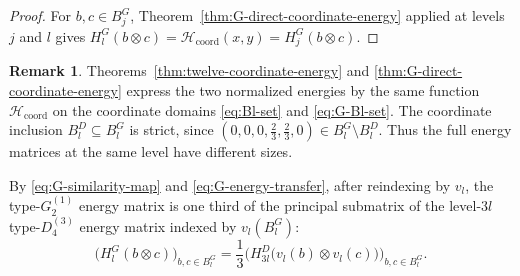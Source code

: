 \documentclass[11pt,reqno]{amsart}
\numberwithin{table}{section}
\numberwithin{equation}{section}
\theoremstyle{plain}
\theoremstyle{definition}
\newtheorem{remark}[theorem]{Remark}
\begin{document}
\begin{proof}
	For \(b,c\in B_j^G\),
	Theorem~\ref{thm:G-direct-coordinate-energy}
	applied at levels \(j\) and \(l\) gives
	\(H_l^G(b\otimes c)
	=\mathscr H_{\mathrm{coord}}(x,y)
	=H_j^G(b\otimes c)\).
\end{proof}

\begin{remark}
	Theorems~\ref{thm:twelve-coordinate-energy} and
	\ref{thm:G-direct-coordinate-energy} express the two normalized
	energies by the same function
	\(\mathscr H_{\mathrm{coord}}\) on the coordinate domains
	\eqref{eq:Bl-set} and \eqref{eq:G-Bl-set}.
	The coordinate inclusion \(B_l^D\subseteq B_l^G\) is strict,
	since
	\((0,0,0,\tfrac23,\tfrac23,0)\in B_l^G\setminus B_l^D\).
	Thus the full energy matrices at the same level have different sizes.
	
	By \eqref{eq:G-similarity-map} and
	\eqref{eq:G-energy-transfer}, after reindexing by \(v_l\),
	the type-\(G_2^{(1)}\) energy matrix is one third of the
	principal submatrix of the level-\(3l\) type-\(D_4^{(3)}\)
	energy matrix indexed by \(v_l(B_l^G)\):
	\begin{equation}\label{eq:G-energy-matrix-transfer}
		\bigl(
		H_l^G(b\otimes c)
		\bigr)_{b,c\in B_l^G}
		=
		\frac13
		\bigl(
		H_{3l}^D\bigl(v_l(b)\otimes v_l(c)\bigr)
		\bigr)_{b,c\in B_l^G}.
	\end{equation}
\end{remark}
\end{document}
